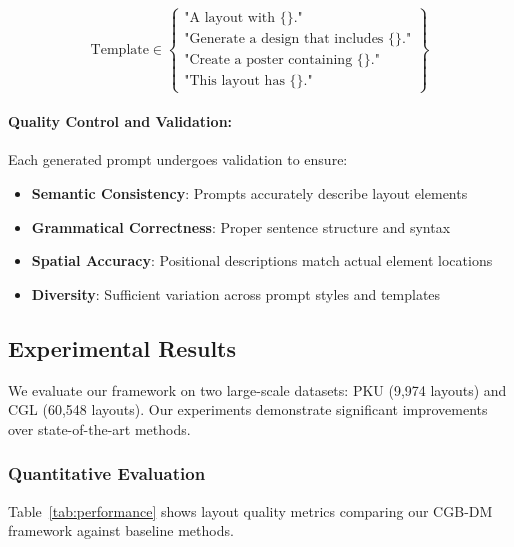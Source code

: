 \documentclass[journal,article,submit,pdftex,moreauthors]{Definitions/mdpi}
\begin{document}
\begin{linenomath}
\begin{equation}
\text{Template} \in \left\{ \begin{array}{l}
\text{"A layout with \{\}."}\\
\text{"Generate a design that includes \{\}."}\\
\text{"Create a poster containing \{\}."}\\
\text{"This layout has \{\}."}
\end{array} \right\}
\end{equation}
\end{linenomath}

\paragraph{Quality Control and Validation:}

Each generated prompt undergoes validation to ensure:
\begin{itemize}
\item \textbf{Semantic Consistency}: Prompts accurately describe layout elements
\item \textbf{Grammatical Correctness}: Proper sentence structure and syntax
\item \textbf{Spatial Accuracy}: Positional descriptions match actual element locations
\item \textbf{Diversity}: Sufficient variation across prompt styles and templates
\end{itemize}

\subsection{Experimental Results}

We evaluate our framework on two large-scale datasets: PKU (9,974 layouts) and CGL (60,548 layouts). Our experiments demonstrate significant improvements over state-of-the-art methods.

\subsubsection{Quantitative Evaluation}

Table~\ref{tab:performance} shows layout quality metrics comparing our CGB-DM framework against baseline methods.
\end{document}
